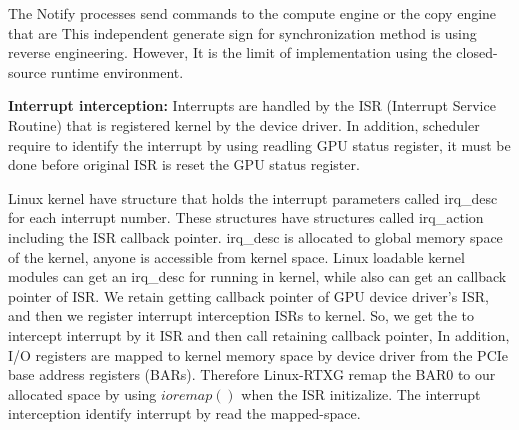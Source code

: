 The Notify processes send commands to the compute engine or the copy engine that are
This independent generate sign for synchronization method is using reverse engineering.
However, It is the limit of implementation using the closed-source runtime environment.


\textbf{Interrupt interception:}
Interrupts are handled by the ISR (Interrupt Service Routine) that is registered kernel by the device driver.
In addition, scheduler require to identify the interrupt by using readling GPU status register, it must be done before original ISR is reset the GPU status register.

Linux kernel have structure that holds the interrupt parameters called irq\_desc for each interrupt number.
These structures have structures called irq\_action including the ISR callback pointer.
irq\_desc is allocated to global memory space of the kernel, anyone is accessible from kernel space.
Linux loadable kernel modules can get an irq\_desc for running in kernel, while also can get an callback pointer of ISR.
We retain getting callback pointer of GPU device driver's ISR, and then we register interrupt interception ISRs to kernel.
So, we get the to intercept interrupt by it ISR and then call retaining callback pointer, 
In addition, I/O registers are mapped to kernel memory space by device driver from the PCIe base address registers (BARs)\cite{fujii:icpads2013,kato2013zero}.
Therefore Linux-RTXG remap the BAR0 to our allocated space by using $ioremap()$ when the ISR initizalize.
The interrupt interception identify interrupt by read the mapped-space.

